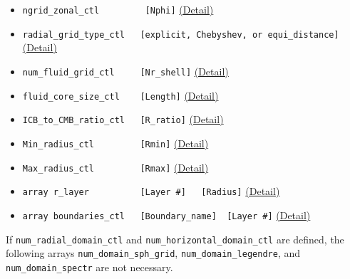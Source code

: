 \begin{itemize}
\begin{itemize}
	\item \verb|ngrid_zonal_ctl         [Nphi]|
		\hyperref[href_t:ngrid_zonal_ctl]{(Detail)}
%
	\item \verb|radial_grid_type_ctl   [explicit, Chebyshev, or equi_distance]| \label{href_i:radial_grid_type_ctl}
		\hyperref[href_t:radial_grid_type_ctl]{(Detail)}
%
	\item \verb|num_fluid_grid_ctl     [Nr_shell]|
		\hyperref[href_t:num_fluid_grid_ctl]{(Detail)}
	\item \verb|fluid_core_size_ctl    [Length]|
		\hyperref[href_t:fluid_core_size_ctl]{(Detail)}
	\item \verb|ICB_to_CMB_ratio_ctl   [R_ratio]|
		\hyperref[href_t:ICB_to_CMB_ratio_ctl]{(Detail)}
	\item \verb|Min_radius_ctl         [Rmin]|
		\hyperref[href_t:Min_radius_ctl]{(Detail)}    
		\label{href_i:Min_radius_ctl}
	\item \verb|Max_radius_ctl         [Rmax]|
			\hyperref[href_t:Max_radius_ctl]{(Detail)}    
		\label{href_i:Max_radius_ctl}
%
\\
	\item \verb|array r_layer          [Layer #]   [Radius]|
		\hyperref[href_t:r_layer]{(Detail)}    
%
	\item \verb|array boundaries_ctl   [Boundary_name]  [Layer #]|
		\hyperref[href_t:boundaries_ctl]{(Detail)}    
	\end{itemize}
\end{itemize}

If \verb|num_radial_domain_ctl| and \verb|num_horizontal_domain_ctl| are defined, the following arrays \verb|num_domain_sph_grid|, \verb|num_domain_legendre|, and \verb|num_domain_spectr| are not necessary.

